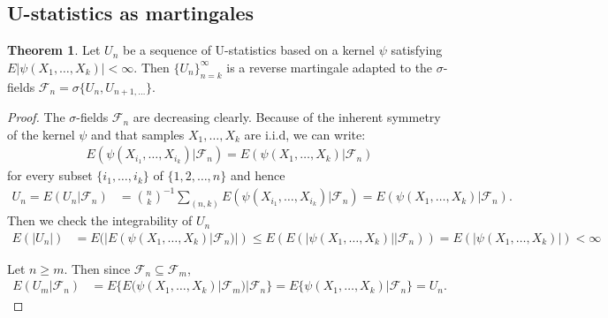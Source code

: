 \documentclass{article}
\theoremstyle{definition}
\newtheorem{theorem}{Theorem}
\numberwithin{Def}{section}
\begin{document}
\subsection{U-statistics as martingales}
\begin{theorem}
Let $U_n$ be a sequence of U-statistics based on a kernel $\psi$ satisfying $E|\psi(X_1, \dotsc, X_k)|<\infty$. Then $\{U_n\}_{n=k}^\infty$ is a reverse martingale adapted to the $\sigma$-fields $\mathcal{F}_n=\sigma\{U_n, U_{n+1,\dotsc}\}$.
\end{theorem}

\begin{proof}
The $\sigma$-fields $\mathcal{F}_n$ are decreasing clearly. Because of the inherent symmetry of the kernel $\psi$ and that samples $X_1, \dotsc, X_k$ are i.i.d, we can write:
\begin{align*}
    E(\psi (X_{i_1}, \dotsc, X_{i_k})|\mathcal{F}_n)=E(\psi (X_1, \dotsc, X_k)|\mathcal{F}_n)
\end{align*}
for every subset $\{i_1, \dotsc, i_k\}$ of $\{1,2,\dotsc,n\}$ and hence 
\begin{align*}
    U_n=E(U_n|\mathcal{F}_n)&={n\choose k}^{-1}\sum_{(n,k)}E(\psi(X_{i_1}, \dotsc,X_{i_k})|\mathcal{F}_n)
    =E(\psi(X_1,\dotsc,X_k)|\mathcal{F}_n).
\end{align*}
Then we check the integrability of $U_n$
\begin{align*}
E(|U_n|)&=E(|E(\psi(X_1,\dotsc,X_k)|\mathcal{F}_n)|)\le E(E(|\psi(X_1,\dotsc,X_k)||\mathcal{F}_n))
=E(|\psi(X_1,\dotsc, X_k)|)<\infty
\end{align*}

Let $n\ge m$. Then since $\mathcal{F}_n \subseteq \mathcal{F}_m$,
\begin{align*}
    E(U_m|\mathcal{F}_n)&=E\{E(\psi(X_1,\dotsc,X_k)|\mathcal{F}_m)|\mathcal{F}_n\}
    =E\{\psi(X_1,\dotsc,X_k)|\mathcal{F}_n\}
    =U_n.
\end{align*}
\end{proof}
\end{document}

